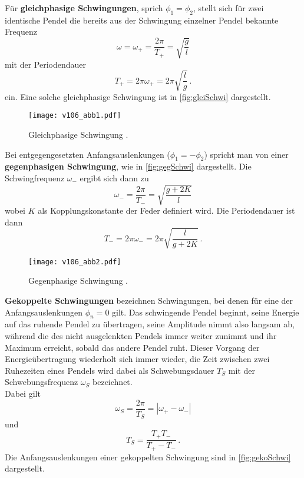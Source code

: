 \newpage

Für \textbf{gleichphasige Schwingungen}, sprich $\phi_1=\phi_2$, stellt sich für zwei identische Pendel die bereits aus der Schwingung einzelner Pendel bekannte Frequenz \\ 
\begin{equation}
    \omega = \omega_+ = \frac{2π}{T_+} = \sqrt{\frac{g}{l}} \label{eq:omega+}
\end{equation}
mit der Periodendauer 
\begin{equation}
T_+ = 2\pi \omega_+ = 2\pi \sqrt{\dfrac{l}{g}}\,.
\label{eq:T_+}
\end{equation}
ein. Eine solche gleichphasige Schwingung ist in \autoref{fig:gleiSchwi} dargestellt.

\begin{figure}
    \centering
    \texttt{[image: v106\_abb1.pdf]}
    \caption{Gleichphasige Schwingung \cite{ap01}.}
    \label{fig:gleiSchwi}
\end{figure}

Bei entgegengesetzten Anfangsauslenkungen ($\phi_1=-\phi_2$) spricht man von einer \\ 
\textbf{gegenphasigen Schwingung}, wie in \autoref{fig:gegSchwi} dargestellt. Die Schwingfrequenz $\omega_-$ ergibt sich dann zu
\begin{equation}
    \omega_- = \frac{2π}{T_-} = \sqrt{\frac{g+2K}{l}} \label{eq:omega-}
\end{equation}
wobei $K$ als Kopplungskonstante der Feder definiert wird.
Die Periodendauer ist dann 
\begin{equation}
    T_- = 2 \pi \omega_- = 2 \pi \sqrt{\dfrac{l}{g+2K}} \,.
\label{eq:T_-}
\end{equation}

\begin{figure}
    \centering
    \texttt{[image: v106\_abb2.pdf]}
    \caption{Gegenphasige Schwingung \cite{ap01}.}
    \label{fig:gegSchwi}
\end{figure}

\newpage

\textbf{Gekoppelte Schwingungen} bezeichnen Schwingungen, bei denen für eine der Anfangsauslenkungen $\phi_n = 0$ gilt.
Das schwingende Pendel beginnt, seine Energie auf das ruhende Pendel zu übertragen, seine Amplitude nimmt also langsam ab, während die des nicht ausgelenkten Pendels immer weiter zunimmt und ihr Maximum erreicht, sobald das andere Pendel ruht.
Dieser Vorgang der Energieübertragung wiederholt sich immer wieder, die Zeit zwischen zwei Ruhezeiten eines Pendels wird dabei als Schwebungsdauer $T_S$ mit der Schwebungsfrequenz $\omega_S$ bezeichnet. \\
Dabei gilt 
\begin{equation}
    \omega_S = \frac{2π}{T_S} =  |\omega_+ - \omega_-| \label{eq:omegaS}
\end{equation}
und
\begin{equation}
    T_S = \dfrac{T_+ T_-}{T_+ - T_-} \label{eq:T_S} \,.
\end{equation}
Die Anfangsauslenkungen einer gekoppelten Schwingung sind in \autoref{fig:gekoSchwi} dargestellt.

